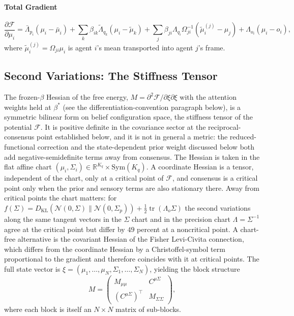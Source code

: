 \paragraph{Total Gradient}
\begin{equation}
\frac{\partial \mathcal{F}}{\partial \mu_i} = \bar{\Lambda}_{p_i}(\mu_i - \bar{\mu}_i) + \sum_k \beta_{ik}\tilde{\Lambda}_{q_k}(\mu_i - \tilde{\mu}_k) + \sum_j \beta_{ji}\Lambda_{q_i}\Omega_{ji}^{-1}(\tilde{\mu}_i^{(j)} - \mu_j) + \Lambda_{o_i}(\mu_i - o_i),
\label{eq:total_gradient_mu}
\end{equation}
where $\tilde{\mu}_i^{(j)} = \Omega_{ji}\mu_i$ is agent $i$'s mean transported into agent $j$'s frame.

\subsection{Second Variations: The Stiffness Tensor}

The frozen-$\beta$ Hessian of the free energy, $M = \partial^2 \mathcal{F}/\partial\xi\partial\xi$ with the attention weights held at $\beta^*$ (see the differentiation-convention paragraph below), is a symmetric bilinear form on belief configuration space, the stiffness tensor of the potential $\mathcal{F}$. It is positive definite in the covariance sector at the reciprocal-consensus point established below, and it is not in general a metric: the reduced-functional correction and the state-dependent prior weight discussed below both add negative-semidefinite terms away from consensus. The Hessian is taken in the flat affine chart $(\mu_i, \Sigma_i) \in \mathbb{R}^{K_q} \times \mathrm{Sym}(K_q)$. A coordinate Hessian is a tensor, independent of the chart, only at a critical point of $\mathcal{F}$, and consensus is a critical point only when the prior and sensory terms are also stationary there. Away from critical points the chart matters: for $f(\Sigma) = D_{\mathrm{KL}}(\mathcal{N}(0,\Sigma)\|\mathcal{N}(0,\Sigma_p)) + \tfrac12\operatorname{tr}(\Lambda_o\Sigma)$ the second variations along the same tangent vectors in the $\Sigma$ chart and in the precision chart $\Lambda = \Sigma^{-1}$ agree at the critical point but differ by $49$ percent at a noncritical point. A chart-free alternative is the covariant Hessian of the Fisher Levi-Civita connection, which differs from the coordinate Hessian by a Christoffel-symbol term proportional to the gradient and therefore coincides with it at critical points. The full state vector is $\xi = (\mu_1, \ldots, \mu_N, \Sigma_1, \ldots, \Sigma_N)$, yielding the block structure
\begin{equation}
M = \begin{pmatrix} M_{\mu\mu} & C^{\mu\Sigma} \\ (C^{\mu\Sigma})^\top & M_{\Sigma\Sigma} \end{pmatrix},
\label{eq:mass_block_structure}
\end{equation}
where each block is itself an $N \times N$ matrix of sub-blocks.

